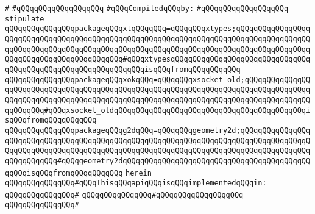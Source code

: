 \verb|#|\newline
\verb|#qQQqqQQqqQQqqQQqqQQq|\newline
\newline
\verb|#qQQqCompiledqQQqby:|\newline
\verb|#qQQqqQQqqQQqqQQqqQQq|\newline
\newline
\newline
\newline
\verb|stipulate|\newline
\verb|qQQqqQQqqQQqqQQqpackageqQQqxtqQQqqQQq=qQQqqQQqxtypes;qQQqqQQqqQQqqQQqqQQqqQQqqQQqqQQqqQQqqQQqqQQqqQQqqQQqqQQqqQQqqQQqqQQqqQQqqQQqqQQqqQQqqQQqqQQqqQQqqQQqqQQqqQQqqQQqqQQqqQQqqQQqqQQqqQQqqQQqqQQqqQQqqQQqqQQqqQQqqQQqqQQqqQQqqQQqqQQqqQQqqQQq#qQQqxtypesqQQqqQQqqQQqqQQqqQQqqQQqqQQqqQQqqQQqqQQqqQQqqQQqqQQqqQQqqQQqqQQqisqQQqfromqQQqqQQqqQQq|\newline
\verb|qQQqqQQqqQQqqQQqpackageqQQqxokqQQq=qQQqqQQqxsocket_old;qQQqqQQqqQQqqQQqqQQqqQQqqQQqqQQqqQQqqQQqqQQqqQQqqQQqqQQqqQQqqQQqqQQqqQQqqQQqqQQqqQQqqQQqqQQqqQQqqQQqqQQqqQQqqQQqqQQqqQQqqQQqqQQqqQQqqQQqqQQqqQQqqQQqqQQqqQQqqQQqqQQq#qQQqxsocket_oldqQQqqQQqqQQqqQQqqQQqqQQqqQQqqQQqqQQqqQQqqQQqisqQQqfromqQQqqQQqqQQq|\newline
\verb|qQQqqQQqqQQqqQQqpackageqQQqg2dqQQq=qQQqqQQqgeometry2d;qQQqqQQqqQQqqQQqqQQqqQQqqQQqqQQqqQQqqQQqqQQqqQQqqQQqqQQqqQQqqQQqqQQqqQQqqQQqqQQqqQQqqQQqqQQqqQQqqQQqqQQqqQQqqQQqqQQqqQQqqQQqqQQqqQQqqQQqqQQqqQQqqQQqqQQqqQQqqQQqqQQqqQQq#qQQqgeometry2dqQQqqQQqqQQqqQQqqQQqqQQqqQQqqQQqqQQqqQQqqQQqqQQqisqQQqfromqQQqqQQqqQQq|\newline
\verb|herein|\newline
\newline
\verb|qQQqqQQqqQQqqQQq#qQQqThisqQQqapiqQQqisqQQqimplementedqQQqin:|\newline
\verb|qQQqqQQqqQQqqQQq#|\newline
\verb|qQQqqQQqqQQqqQQq#qQQqqQQqqQQqqQQqqQQq|\newline
\verb|qQQqqQQqqQQqqQQq#|\newline
